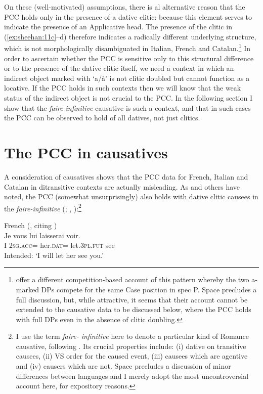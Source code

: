 \documentclass[output=paper,colorlinks,citecolor=brown,nonflat]{./langscibook}
\begin{document}
On these (well-motivated) assumptions, there is al alternative reason that the PCC holds only in the presence of a dative clitic:  because this element serves to indicate the presence of an Applicative head. The presence of the clitic in (\ref{ex:sheehan:11c}--d) therefore indicates a radically different underlying structure, which is not morphologically disambiguated in Italian, French and Catalan.\footnote{\citet{OrmazabalRomero2013Borealis} offer a different competition-based account of this pattern whereby the two a-marked DPs compete for the same Case position in spec \liv P. Space precludes a full discussion, but, while attractive, it seems that their account cannot be extended to the causative data to be discussed below, where the PCC holds with full DPs even in the absence of clitic doubling.} In order to ascertain whether the PCC is sensitive only to this structural difference or to the presence of the dative clitic itself, we need a context in which an indirect object marked with ‘a/à’ is not clitic doubled but cannot function as a locative. If the PCC holds in such contexts then we will know that the weak status of the indirect object is not crucial to the PCC. In the following section I show that the \textit{faire-infinitive} causative is such a context, and that in such cases the PCC can be observed to hold of all datives, not just clitics.

\section{The PCC in causatives}\label{sec:sheehan:3}

A consideration of causatives shows that the PCC data for French, Italian and Catalan in ditransitive contexts are actually misleading. As \citet{Bonet1991} and others have noted, the PCC (somewhat unsurprisingly) also holds with dative clitic causees in the \textit{faire-infinitive} (\citealt{Postal1981}; \citealt{Quicoli1984}, \citealt{Rezac2008}):\footnote{I use the term \emph{faire- infinitive} here to denote a particular kind of Romance causative, following \citet{Kayne1975}. Its crucial properties include: (i) dative on transitive causees, (ii) VS order for the caused event, (iii) causees which are agentive and (iv) causers which are not. Space precludes a discussion of minor differences between languages and I merely adopt the most uncontroversial account here, for expository reasons.} 

\ea%
    \label{ex:sheehan:13}
    French (\citealt[66]{Rezac2008}, citing \citealt{Postal1981, Quicoli1984})\\
    \gll    *Je   vous     lui           laisserai   voir.\\
            I      2\textsc{sg}.\textsc{acc}=   her.\textsc{dat=}   let.3\textsc{pl}.\textsc{fut}    see\\
    \glt    Intended: ‘I will let her see you.'
\z
\end{document}
